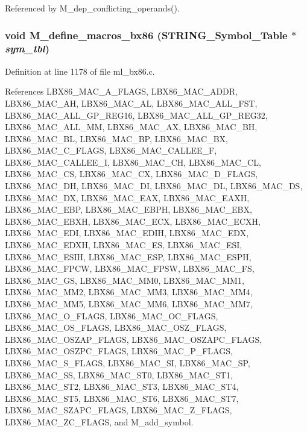 Referenced by M\_\-dep\_\-conflicting\_\-operands().
\subsubsection{\setlength{\rightskip}{0pt plus 5cm}void M\_\-define\_\-macros\_\-bx86 (\bf{STRING\_\-Symbol\_\-Table} $\ast$ {\em sym\_\-tbl})}\label{m__bx86_8h_a56b8ff3ce4bd6afc405a3733f34ddfb}




Definition at line 1178 of file ml\_\-bx86.c.

References LBX86\_\-MAC\_\-A\_\-FLAGS, LBX86\_\-MAC\_\-ADDR, LBX86\_\-MAC\_\-AH, LBX86\_\-MAC\_\-AL, LBX86\_\-MAC\_\-ALL\_\-FST, LBX86\_\-MAC\_\-ALL\_\-GP\_\-REG16, LBX86\_\-MAC\_\-ALL\_\-GP\_\-REG32, LBX86\_\-MAC\_\-ALL\_\-MM, LBX86\_\-MAC\_\-AX, LBX86\_\-MAC\_\-BH, LBX86\_\-MAC\_\-BL, LBX86\_\-MAC\_\-BP, LBX86\_\-MAC\_\-BX, LBX86\_\-MAC\_\-C\_\-FLAGS, LBX86\_\-MAC\_\-CALLEE\_\-F, LBX86\_\-MAC\_\-CALLEE\_\-I, LBX86\_\-MAC\_\-CH, LBX86\_\-MAC\_\-CL, LBX86\_\-MAC\_\-CS, LBX86\_\-MAC\_\-CX, LBX86\_\-MAC\_\-D\_\-FLAGS, LBX86\_\-MAC\_\-DH, LBX86\_\-MAC\_\-DI, LBX86\_\-MAC\_\-DL, LBX86\_\-MAC\_\-DS, LBX86\_\-MAC\_\-DX, LBX86\_\-MAC\_\-EAX, LBX86\_\-MAC\_\-EAXH, LBX86\_\-MAC\_\-EBP, LBX86\_\-MAC\_\-EBPH, LBX86\_\-MAC\_\-EBX, LBX86\_\-MAC\_\-EBXH, LBX86\_\-MAC\_\-ECX, LBX86\_\-MAC\_\-ECXH, LBX86\_\-MAC\_\-EDI, LBX86\_\-MAC\_\-EDIH, LBX86\_\-MAC\_\-EDX, LBX86\_\-MAC\_\-EDXH, LBX86\_\-MAC\_\-ES, LBX86\_\-MAC\_\-ESI, LBX86\_\-MAC\_\-ESIH, LBX86\_\-MAC\_\-ESP, LBX86\_\-MAC\_\-ESPH, LBX86\_\-MAC\_\-FPCW, LBX86\_\-MAC\_\-FPSW, LBX86\_\-MAC\_\-FS, LBX86\_\-MAC\_\-GS, LBX86\_\-MAC\_\-MM0, LBX86\_\-MAC\_\-MM1, LBX86\_\-MAC\_\-MM2, LBX86\_\-MAC\_\-MM3, LBX86\_\-MAC\_\-MM4, LBX86\_\-MAC\_\-MM5, LBX86\_\-MAC\_\-MM6, LBX86\_\-MAC\_\-MM7, LBX86\_\-MAC\_\-O\_\-FLAGS, LBX86\_\-MAC\_\-OC\_\-FLAGS, LBX86\_\-MAC\_\-OS\_\-FLAGS, LBX86\_\-MAC\_\-OSZ\_\-FLAGS, LBX86\_\-MAC\_\-OSZAP\_\-FLAGS, LBX86\_\-MAC\_\-OSZAPC\_\-FLAGS, LBX86\_\-MAC\_\-OSZPC\_\-FLAGS, LBX86\_\-MAC\_\-P\_\-FLAGS, LBX86\_\-MAC\_\-S\_\-FLAGS, LBX86\_\-MAC\_\-SI, LBX86\_\-MAC\_\-SP, LBX86\_\-MAC\_\-SS, LBX86\_\-MAC\_\-ST0, LBX86\_\-MAC\_\-ST1, LBX86\_\-MAC\_\-ST2, LBX86\_\-MAC\_\-ST3, LBX86\_\-MAC\_\-ST4, LBX86\_\-MAC\_\-ST5, LBX86\_\-MAC\_\-ST6, LBX86\_\-MAC\_\-ST7, LBX86\_\-MAC\_\-SZAPC\_\-FLAGS, LBX86\_\-MAC\_\-Z\_\-FLAGS, LBX86\_\-MAC\_\-ZC\_\-FLAGS, and M\_\-add\_\-symbol.

